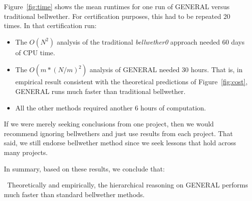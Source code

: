 \documentclass[10pt,journal,compsoc]{IEEEtran}
\newcommand{\fig}[1]{Figure~\ref{fig:#1}}
\newcommand{\bi}{\begin{itemize}}
\newcommand{\ei}{\end{itemize}}
\newenvironment{RQ}[1]%
{\noindent\begin{minipage}[c]{\linewidth}%
\begin{bclogo}[couleur=gray!20,%
                arrondi=0.1,logo=\bctrombone,%
                ombre=true%
                ]{{\small  ~#1}}}%
{\end{bclogo}\vspace{2mm}\end{minipage}}
\begin{document}
\fig{time} shows the mean runtimes for one run of GENERAL versus traditional bellwether. For certification purposes, this had to be repeated 20 times. In that certification run:
\bi
\item
The $O(N^2)$ analysis of the traditional {\em bellwether0} approach needed 60 days of CPU time.
\item 
The $O(m*(N/m)^2)$ analysis
of GENERAL needed 30  hours. That is, in empirical
 result consistent with the theoretical predictions of \fig{cost}, GENERAL runs much faster than traditional bellwether.
\item All the other methods required
another 6 hours of computation. 
\ei
If we were merely seeking conclusions from one project, then we would recommend ignoring bellwethers
and just use results from each project. That said, we still endorse bellwether method since  we seek
lessons that hold across many projects.

In summary, based on these results, we conclude that:


\begin{RQ}{Theoretically and empirically, the  hierarchical reasoning on GENERAL performs much faster than standard bellwether methods.}
\end{RQ}
\end{document}
